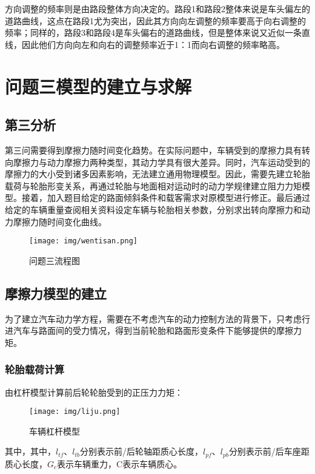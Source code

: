 \documentclass[withoutpreface,bwprint]{cumcmthesis} %
\begin{document}
方向调整的频率则是由路段整体方向决定的。路段1和路段2整体来说是车头偏左的道路曲线，这点在路段1尤为突出，因此其方向向左调整的频率要高于向右调整的频率；同样的，路段3和路段4是车头偏右的道路曲线，但是整体来说又近似一条直线，因此他们方向向左和向右的调整频率近于1：1而向右调整的频率略高。



\section{问题三模型的建立与求解}
\subsection{第三分析}
第三问需要得到摩擦力随时间变化趋势。在实际问题中，车辆受到的摩擦力具有转向摩擦力与动力摩擦力两种类型，其动力学具有很大差异。同时，汽车运动受到的摩擦力的大小受到诸多因素影响，无法建立通用物理模型。因此，需要先建立轮胎载荷与轮胎形变关系，再通过轮胎与地面相对运动时的动力学规律建立阻力力矩模型。接着，加入题目给定的路面倾斜条件和载客需求对原模型进行修正。最后通过给定的车辆重量查阅相关资料设定车辆与轮胎相关参数，分别求出转向摩擦力和动力摩擦力随时间变化曲线。

\begin{figure}[htbp]
    \centering
    \texttt{[image: img/wentisan.png]}
     \captionsetup{font=small, position=below}
    \caption{问题三流程图}
    
\end{figure}

\subsection{摩擦力模型的建立}
为了建立汽车动力学方程，需要在不考虑汽车的动力控制方法的背景下，只考虑行进汽车与路面间的受力情况，得到当前轮胎和路面形变条件下能够提供的摩擦力矩。

\subsubsection{轮胎载荷计算}

由杠杆模型计算前后轮轮胎受到的正压力力矩：
\begin{figure}[htbp]
    \centering
    \texttt{[image: img/liju.png]}
     \captionsetup{font=small, position=below}
    \caption{车辆杠杆模型}
\end{figure}
其中，其中，$l_{tf}$、$l_{tb}$分别表示前/后轮轴距质心长度，$l_{pf}$、$l_{pb}$分别表示前/后车座距质心长度，$ G_c$表示车辆重力，C表示车辆质心。
\end{document}
